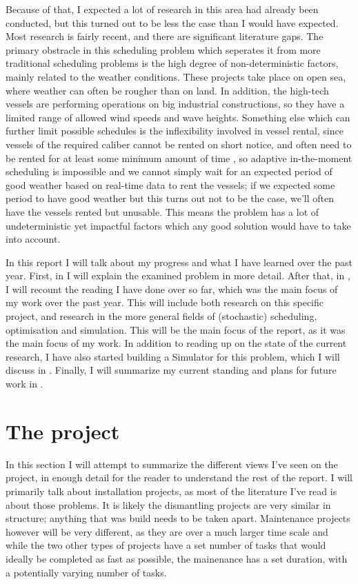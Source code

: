 \documentclass[a4paper,12pt]{article}
\begin{document}
Because of that, I expected a lot of research in this area had already been conducted, but this turned out to be less the case than I would have expected. Most research is fairly recent, and there are significant literature gaps. The primary obstracle in this scheduling problem which seperates it from more traditional scheduling problems is the high degree of non-deterministic factors, mainly related to the weather conditions. These projects take place on open sea, where weather can often be rougher than on land. In addition, the high-tech vessels are performing operations on big industrial constructions, so they have a limited range of allowed wind speeds and wave heights. Something else which can further limit possible schedules is the inflexibility involved in vessel rental, since vessels of the required caliber cannot be rented on short notice, and often need to be rented for at least some minimum amount of time \cite{kerkhove2017optimised}, so adaptive in-the-moment scheduling is impossible and we cannot simply wait for an expected period of good weather based on real-time data to rent the vessels; if we expected some period to have good weather but this turns out not to be the case, we'll often have the vessels rented but unusable. This means the problem has a lot of undeterministic yet impactful factors which any good solution would have to take into account. 

In this report I will talk about my progress and what I have learned over the past year. First, in  I will explain the examined problem in more detail. After that, in , I will recount the reading I have done over so far, which was the main focus of my work over the past year. This will include both research on this specific project, and research in the more general fields of (stochastic) scheduling, optimisation and simulation. This will be the main focus of the report, as it was the main focus of my work. In addition to reading up on the state of the current research, I have also started building a Simulator for this problem, which I will discuss in . Finally, I will summarize my current standing and plans for future work in . 

\pagebreak

\section{The project} \label{s:project}
In this section I will attempt to summarize the different views I've seen on the project, in enough detail for the reader to understand the rest of the report. I will primarily talk about installation projects, as most of the literature I've read is about those problems. It is likely the dismantling projects are very similar in structure; anything that was build needs to be taken apart. Maintenance projects however will be very different, as they are over a much larger time scale and while the two other types of projects have a set number of tasks that would ideally be completed as fast as possible, the mainenance has a set duration, with a potentially varying number of tasks.
\end{document}
